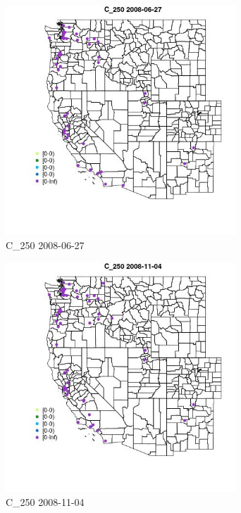\begin{figure} 
\centering  
\includegraphics[width=0.77\textwidth]{Code_Outputs/Report_ML_input_PM25_Step4_part_e_de_duplicated_aves_MapObsC_2502008-06-27.jpg} 
\caption{\label{fig:Report_ML_input_PM25_Step4_part_e_de_duplicated_avesMapObsC_2502008-06-27}C_250 2008-06-27} 
\end{figure} 
 

\begin{figure} 
\centering  
\includegraphics[width=0.77\textwidth]{Code_Outputs/Report_ML_input_PM25_Step4_part_e_de_duplicated_aves_MapObsC_2502008-11-04.jpg} 
\caption{\label{fig:Report_ML_input_PM25_Step4_part_e_de_duplicated_avesMapObsC_2502008-11-04}C_250 2008-11-04} 
\end{figure} 
 

